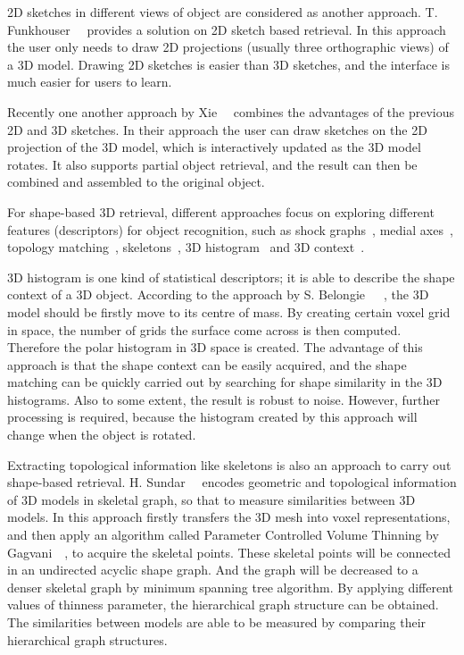 2D sketches in different views of object are considered as another approach. T. Funkhouser~\etal~\cite{Funkhouser:2003:SEM:588272.588279} provides a solution on 2D sketch based retrieval. In this approach the user only needs to draw 2D projections (usually three orthographic views) of a 3D model. Drawing 2D sketches is easier than 3D sketches, and the interface is much easier for users to learn.  

Recently one another approach by Xie~\etal~\cite{CGF:CGF12200} combines the advantages of the previous 2D and 3D sketches. In their approach the user can draw sketches on the 2D projection of the 3D model, which is interactively updated as the 3D model rotates. It also supports partial object retrieval, and the result can then be combined and assembled to the original object. 

For shape-based 3D retrieval, different approaches focus on exploring different features (descriptors) for object recognition, such as shock graphs~\cite{siddiqi1999shock}, medial axes~\cite{bardinet2000structural}, topology matching~\cite{hilaga2001topology}, skeletons~\cite{sundar2003skeleton}, 3D histogram~\cite{belongie2002shape} and 3D context~\cite{belongie2001matching}. 

3D histogram is one kind of statistical descriptors; it is able to describe the shape context of a 3D object. According to the approach by S. Belongie~\etal~\cite{belongie2001matching}~\cite{belongie2002shape}, the 3D model should be firstly move to its centre of mass. By creating certain voxel grid in space, the number of grids the surface come across is then computed. Therefore the polar histogram in 3D space is created. The advantage of this approach is that the shape context can be easily acquired, and the shape matching can be quickly carried out by searching for shape similarity in the 3D histograms. Also to some extent, the result is robust to noise. However, further processing is required, because the histogram created by this approach will change when the object is rotated. 

Extracting topological information like skeletons is also an approach to carry out shape-based retrieval. H. Sundar~\etal~\cite{sundar2003skeleton} encodes geometric and topological information of 3D models in skeletal graph, so that to measure similarities between 3D models. In this approach firstly transfers the 3D mesh into voxel representations, and then apply an algorithm called Parameter Controlled Volume Thinning by Gagvani~\etal~\cite{gagvani1999parameter}, to acquire the skeletal points. These skeletal points will be connected in an undirected acyclic shape graph. And the graph will be decreased to a denser skeletal graph by minimum spanning tree algorithm. By applying different values of thinness parameter, the hierarchical graph structure can be obtained. The similarities between models are able to be measured by comparing their hierarchical graph structures. 

